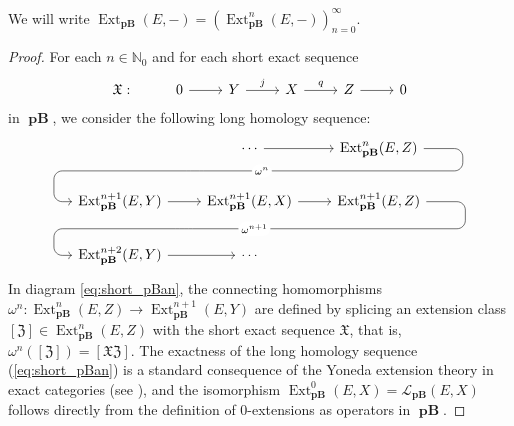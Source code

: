 \documentclass[12pt,a4paper]{amsproc}
\theoremstyle{remark}
\theoremstyle{definition}
\newcommand{\Ext}{\operatorname{Ext}}
\newcommand{\pBan}{\operatorname{\textbf{pB}}}
\numberwithin{equation}{section}
\begin{document}
  We will write $\Ext_{\boldsymbol{\pBan}}(E,-) = (\Ext^n_{\boldsymbol{\pBan}}(E,-))_{n=0}^{\infty}$.
    
\begin{proof}
For each $n \in \mathbb{N}_0$ and for each short exact sequence 
$$\begin{tikzcd}
	\mathfrak{X}: & 0 \arrow[r] & Y \arrow[r, "j"] & X \arrow[r, "q"] & Z \arrow[r] & 0 
\end{tikzcd}$$
in $\boldsymbol{\pBan}$, we consider the following long homology sequence:
\begin{equation}\label{eq:short_pBan}
	\begin{tikzcd}
		& \cdots \arrow[r] \arrow[dl, phantom, ""{coordinate, name=Z}] & {\Ext_{\boldsymbol{\pBan}}^n(E,Z)} \arrow[dll, "\omega^n" description, rounded corners=6pt, to path={ -- ([xshift=6.5ex]\tikztostart.east) |- (Z) [very near end] \tikztonodes -| ([xshift=-3ex]\tikztotarget.west) -- (\tikztotarget)}] \\
		{\Ext_{\boldsymbol{\pBan}}^{n+1}(E,Y)} \arrow[r] & {\Ext_{\boldsymbol{\pBan}}^{n+1}(E,X)} \arrow[r] \arrow[dl, phantom, ""{coordinate, name=ZZ}] & {\Ext_{\boldsymbol{\pBan}}^{n+1}(E,Z)} \arrow[dll, "\omega^{n+1}" description, rounded corners=6pt, to path={ -- ([xshift=6.5ex]\tikztostart.east) |- (ZZ) [very near end] \tikztonodes -| ([xshift=-3ex]\tikztotarget.west) -- (\tikztotarget)}] \\
		{\Ext_{\boldsymbol{\pBan}}^{n+2}(E,Y)} \arrow[r] & \cdots &
	\end{tikzcd}
\end{equation}
In diagram \eqref{eq:short_pBan}, the connecting homomorphisms $\omega^n: \Ext^n_{\boldsymbol{\pBan}}(E,Z) \to \Ext^{n+1}_{\boldsymbol{\pBan}}(E,Y)$ are defined by splicing an extension class $[\mathfrak{Z}] \in \Ext^n_{\boldsymbol{\pBan}}(E,Z)$ with the short exact sequence $\mathfrak{X}$, that is, $\omega^n([\mathfrak{Z}]) = [\mathfrak{X} \mathfrak{Z}]$. The exactness of the long homology sequence (\ref{eq:short_pBan}) is a standard consequence of the Yoneda extension theory in exact categories (see \cite[Proposition 5.20]{exact_categ}), and the isomorphism $\Ext^0_{\boldsymbol{\pBan}}(E,X) = \mathcal{L}_{\boldsymbol{\pBan}}(E,X)$ follows directly from the definition of $0$-extensions as operators in $\boldsymbol{\pBan}$.   


\end{proof}
\end{document}
